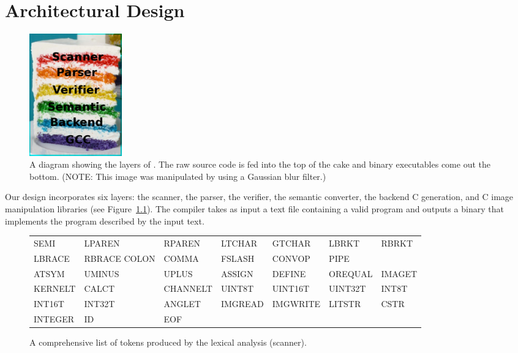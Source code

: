 \chapter{Architectural Design}
\label{chap:archdesign}




\begin{figure}
\begin{center}
\includegraphics[width=40mm]{figures/layers.png}
\caption{A diagram showing the layers of \sys{}. The raw source code is
fed into the top of the cake and binary executables come out the bottom.
(NOTE: This image was manipulated by \sys{} using a Gaussian blur filter.)}
\label{fig:layers}
\end{center}
\end{figure}

Our design incorporates six layers: the scanner, the parser, the verifier,
the semantic converter, the backend C generation, and C image manipulation
libraries (see Figure~\ref{fig:layers}). The compiler takes as input
a text file containing a valid \sys{} program and outputs a binary that
implements the program described by the input text.

\begin{figure}
\begin{center}
\begin{tabular}{l l l l l l l}

    SEMI & LPAREN & RPAREN & LTCHAR & GTCHAR & LBRKT & RBRKT \\
    LBRACE & RBRACE COLON & COMMA & FSLASH & CONVOP & PIPE \\
    ATSYM & UMINUS & UPLUS & ASSIGN & DEFINE & OREQUAL & IMAGET \\
    KERNELT & CALCT & CHANNELT & UINT8T & UINT16T & UINT32T & INT8T \\
    INT16T & INT32T & ANGLET & IMGREAD & IMGWRITE & LITSTR & CSTR \\
    INTEGER & ID & EOF \\

\end{tabular}
\caption{A comprehensive list of tokens produced by the lexical analysis (scanner).}
\label{fig:tokens}
\end{center}
\end{figure}

